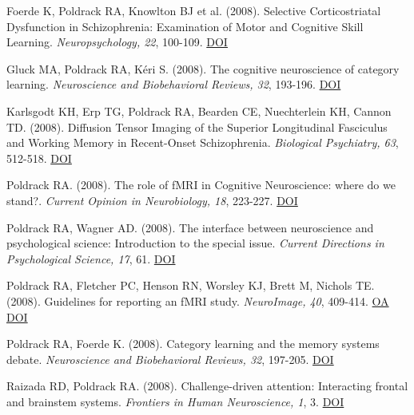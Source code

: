 \documentclass[10pt, letterpaper]{article}
\begin{document}
Foerde K, Poldrack RA, Knowlton BJ et al. (2008). Selective Corticostriatal Dysfunction in Schizophrenia: Examination of Motor and Cognitive Skill Learning. \textit{Neuropsychology, 22}, 100-109. \href{https://doi.org/10.1037/0894-4105.22.1.100}{DOI} \vspace{2mm}

Gluck MA, Poldrack RA, Kéri S.  (2008). The cognitive neuroscience of category learning. \textit{Neuroscience and Biobehavioral Reviews, 32}, 193-196. \href{https://doi.org/10.1016/j.neubiorev.2007.11.002}{DOI} \vspace{2mm}

Karlsgodt KH, Erp TG, Poldrack RA, Bearden CE, Nuechterlein KH, Cannon TD.  (2008). Diffusion Tensor Imaging of the Superior Longitudinal Fasciculus and Working Memory in Recent-Onset Schizophrenia. \textit{Biological Psychiatry, 63}, 512-518. \href{https://doi.org/10.1016/j.biopsych.2007.06.017}{DOI} \vspace{2mm}

Poldrack RA.  (2008). The role of fMRI in Cognitive Neuroscience: where do we stand?. \textit{Current Opinion in Neurobiology, 18}, 223-227. \href{https://doi.org/10.1016/j.conb.2008.07.006}{DOI} \vspace{2mm}

Poldrack RA, Wagner AD.  (2008). The interface between neuroscience and psychological science: Introduction to the special issue. \textit{Current Directions in Psychological Science, 17}, 61. \href{https://doi.org/10.1111/j.1467-8721.2008.00549.x}{DOI} \vspace{2mm}

Poldrack RA, Fletcher PC, Henson RN, Worsley KJ, Brett M, Nichols TE.  (2008). Guidelines for reporting an fMRI study. \textit{NeuroImage, 40}, 409-414. \href{https://www.ncbi.nlm.nih.gov/pmc/articles/PMC2287206}{OA} \href{https://doi.org/10.1016/j.neuroimage.2007.11.048}{DOI} \vspace{2mm}

Poldrack RA, Foerde K.  (2008). Category learning and the memory systems debate. \textit{Neuroscience and Biobehavioral Reviews, 32}, 197-205. \href{https://doi.org/10.1016/j.neubiorev.2007.07.007}{DOI} \vspace{2mm}

Raizada RD, Poldrack RA.  (2008). Challenge-driven attention: Interacting frontal and brainstem systems. \textit{Frontiers in Human Neuroscience, 1}, 3. \href{https://doi.org/10.3389/neuro.09.003.2007}{DOI} \vspace{2mm}
\end{document}
